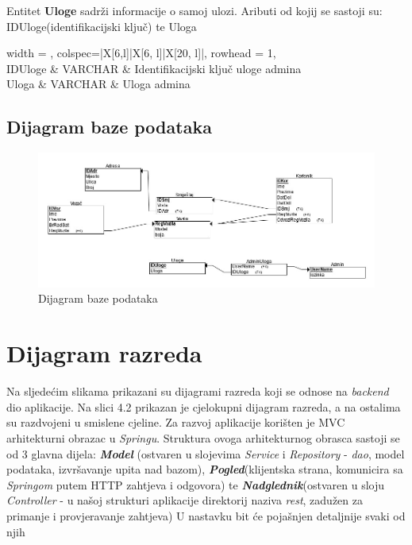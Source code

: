 				{Entitet \textbf{Uloge} sadrži informacije o samoj ulozi. Aributi od kojij se sastoji su: IDUloge(identifikacijski ključ) te Uloga}
				
				\begin{longtblr}[
					label=none,
					entry=none
					]{
						width = \textwidth,
						colspec={|X[6,l]|X[6, l]|X[20, l]|}, 
						rowhead = 1,
					} %
					\hline {}	 \\ \hline[3pt]
					IDUloge & VARCHAR	&  	Identifikacijski ključ uloge admina	\\ \hline
					Uloga	& VARCHAR & Uloga admina	\\ \hline 
					\end{longtblr}

			\subsection{Dijagram baze podataka}
			
			
			\begin{figure}[H]
				\includegraphics[width=\linewidth]{slike/DentAll_RelacijskiDijagramBaze.png}
				\centering
				\caption{Dijagram baze podataka}
				\label{fig:dijagramBaze}
			\end{figure}
			\eject
			
		\section{Dijagram razreda}
		
			{Na sljedećim slikama prikazani su dijagrami razreda koji se odnose na \textit{backend} dio aplikacije. Na slici 4.2 prikazan je cjelokupni dijagram razreda, a na ostalima su razdvojeni u smislene cjeline. Za razvoj aplikacije korišten je MVC arhitekturni obrazac u \textit{Springu}. Struktura ovoga arhitekturnog obrasca sastoji se od 3 glavna dijela: \textbf{\textit{Model}} (ostvaren u slojevima \textit{Service} i \textit{Repository} - \textit{dao}, model podataka, izvršavanje upita nad bazom), \textbf{\textit{Pogled}}(klijentska strana, komunicira sa \textit{Springom} putem HTTP zahtjeva i odgovora) te \textbf{\textit{Nadglednik}}(ostvaren u sloju \textit{Controller} - u našoj strukturi aplikacije direktorij naziva \textit{rest}, zadužen za primanje i provjeravanje zahtjeva) U nastavku bit će pojašnjen detaljnije svaki od njih}\\
			
